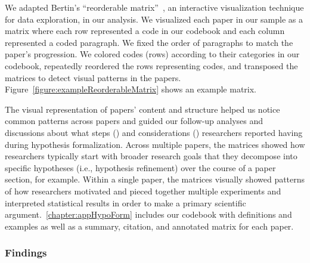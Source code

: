 \figureExampleReorderableMatrix

We adapted Bertin's ``reorderable matrix''~\cite{bertin2011graphics}, an
interactive visualization technique for data exploration, in our analysis. We
visualized each paper in our sample as a matrix where each row represented a
code in our codebook and each column represented a coded paragraph. We fixed the
order of paragraphs to match the paper's progression. We colored codes (rows)
according to their categories in our codebook, repeatedly reordered the rows
representing codes, and transposed the matrices to detect visual patterns in the
papers. Figure~\ref{figure:exampleReorderableMatrix} shows an example matrix. 

The visual representation of papers' content and structure helped us notice
common patterns across papers and guided our follow-up analyses and discussions
about what steps (\rqSteps) and considerations (\rqProcess) researchers reported
having during hypothesis formalization. Across multiple papers, the matrices
showed how researchers typically start with broader research goals that they
decompose into specific hypotheses (i.e., hypothesis refinement) over the course
of a paper section, for example. Within a single paper, the matrices visually
showed patterns of how researchers motivated and pieced together multiple
experiments and interpreted statistical results in order to make a primary
scientific argument.~\autoref{chapter:appHypoForm} includes our codebook with
definitions and examples as well as a summary, citation, and annotated matrix
for each paper.



\subsubsection{Findings}

